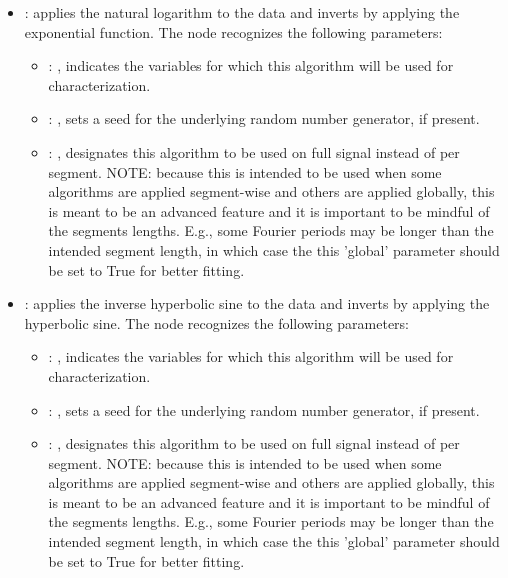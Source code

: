 \begin{itemize}
    \item {}:
      applies the natural logarithm to the data and inverts by applying the
      exponential function.
      The  node recognizes the following parameters:
        \begin{itemize}
          \item {}: , 
            indicates the variables for which this algorithm will be used for characterization.
          \item {}: , 
            sets a seed for the underlying random number generator, if present.
          \item {}: , 
            designates this algorithm to be used on full signal instead of per
            segment. NOTE: because this is intended to be used when some algorithms are
            applied segment-wise and others are applied globally, this is meant to be an
            advanced feature and it is important to be mindful of the segments lengths.
            E.g., some Fourier periods may be longer than the intended segment length, in
            which case the this 'global' parameter should be set to True for better
            fitting. 
      \end{itemize}

    \item {}:
      applies the inverse hyperbolic sine to the data and inverts by applying
      the hyperbolic sine.
      The  node recognizes the following parameters:
        \begin{itemize}
          \item {}: , 
            indicates the variables for which this algorithm will be used for characterization.
          \item {}: , 
            sets a seed for the underlying random number generator, if present.
          \item {}: , 
            designates this algorithm to be used on full signal instead of per
            segment. NOTE: because this is intended to be used when some algorithms are
            applied segment-wise and others are applied globally, this is meant to be an
            advanced feature and it is important to be mindful of the segments lengths.
            E.g., some Fourier periods may be longer than the intended segment length, in
            which case the this 'global' parameter should be set to True for better
            fitting. 
      \end{itemize}


\end{itemize}
